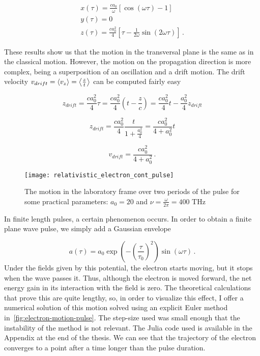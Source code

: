 \documentclass[12pt, class=report, crop=false]{standalone}
\begin{document}
\begin{subequations}
  \begin{align}
    x(\tau) = \frac{ca_0}{\omega} \left[\cos(\omega \tau) - 1 \right] \\
    y(\tau) = 0\\
    z(\tau) = \frac{ca_0^2}{4} \left[\tau - \frac{1}{2\omega} \sin(2\omega \tau)\right]\,.
  \end{align}
\end{subequations}

These results show us that the motion in the transversal plane is the same as in the classical motion. However, the motion on the propagation direction is more complex, being a superposition of an oscillation and a drift motion. The drift velocity \(v_{drift} = \expval{v_z} = \expval{\frac{z}{t}}\) can be computed fairly easy

\begin{equation*}
  z_{drift} = \frac{ca_0^2}{4} \tau = \frac{ca_0^2}{4} \left( t - \frac{z}{c} \right) = \frac{ca_0^2}{4} t - \frac{a_0^2}{4} z_{drift}
\end{equation*}

\begin{equation*}
  z_{drift} = \frac{ca_0^2}{4} \frac{t}{1+\frac{a_0^2}{4}} = \frac{ca_0^2}{4+a_0^2} t
\end{equation*}

\begin{equation}
  v_{drift} = \frac{ca_0^2}{4+a_0^2}\,.
\end{equation}

\begin{figure}[h]
  \centering
  \texttt{[image: relativistic\_electron\_cont\_pulse]}%
  \caption{The motion in the laboratory frame over two periods of the pulse for some practical parameters: \(a_0 = 20\) and \(\nu=\frac{\omega}{2\pi} = 400\) THz}\label{fig:electron-motion-cont}%
\end{figure}

In finite length pulses, a certain phenomenon occurs. In order to obtain a finite plane wave pulse, we simply add a Gaussian envelope

\begin{equation}
  a(\tau) = a_0 \exp(-\left(\frac{\tau}{\tau_0}\right)^2) \sin(\omega \tau)\,.
\end{equation}
Under the fields given by this potential, the electron starts moving, but it stops when the wave passes it. Thus, although the electron is moved forward, the net energy gain in its interaction with the field is zero. The theoretical calculations that prove this are quite lengthy, so, in order to visualize this effect, I offer a numerical solution of this motion solved using an explicit Euler method in~\cref{fig:electron-motion-pulse}. The step-size used was small enough that the instability of the method is not relevant. The Julia code used is available in the Appendix at the end of the thesis. We can see that the trajectory of the electron converges to a point after a time longer than the pulse duration.
\end{document}
